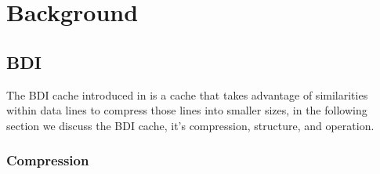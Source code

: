 
\chapter{Background}
\label{ch:Background}

\section{BDI}
\label{sec:BDI}
The BDI cache introduced in \cite{bdi} is a cache that takes advantage of similarities within data lines to compress those lines into smaller sizes, in the following section we discuss the BDI cache, it's compression, structure, and operation.
\subsection{Compression}
\label{Compression}
